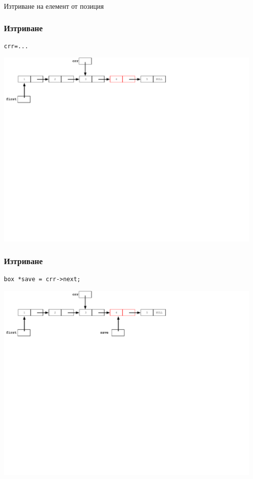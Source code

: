 \documentclass{beamer}
\begin{document}
\begin{frame}
\centerline{Изтриване на елемент от позиция}
\end{frame}




\begin{frame}[fragile]
\frametitle{Изтриване}

\begin{flushleft}
\begin{lstlisting}
crr=...
\end{lstlisting}  
\end{flushleft}


\includegraphics[width=14.0cm]{images/07_ll_remove_stepone}

\end{frame}


\begin{frame}[fragile]
\frametitle{Изтриване}

\begin{flushleft}
\begin{lstlisting}
box *save = crr->next;
\end{lstlisting}  
\end{flushleft}


\includegraphics[width=14.0cm]{images/07_ll_remove_save}

\end{frame}
\end{document}
